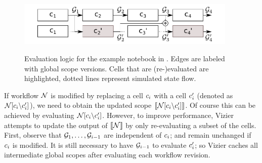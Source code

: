 \begin{figure}
  \centering
  \vspace{-4mm}
  \includegraphics[width=10.5cm]{graphics/eval.pdf}\\[-5mm]
  \caption{Evaluation logic for the example notebook in .  Edges are labeled with global scope versions.  Cells that are (re-)evaluated are highlighted, dotted lines represent simulated state flow.}
  \label{fig:exampleEval}
\end{figure}
If workflow $\mathcal N$ is modified by replacing a cell $c_i$ with a cell $c_i'$ (denoted as $\mathcal N[c_i \backslash c_i']$), we need to obtain the updated scope $\llbracket \mathcal N[c_i \backslash c_i'] \rrbracket$. Of course this can be achieved by evaluating $\mathcal N[c_i \backslash c_i']$.
However, to improve performance,  Vizier attempts to update the output of $\llbracket \mathcal N \rrbracket$ by only re-evaluating a subset of the cells.
First, observe that $\mathcal G_1, \ldots, \mathcal G_{i-1}$ are independent of $c_i$; and remain unchanged if $c_i$ is modified.
It is still necessary to have $\mathcal G_{i-1}$ to evaluate $c_i'$; so Vizier caches all intermediate global scopes after evaluating each workflow revision.



